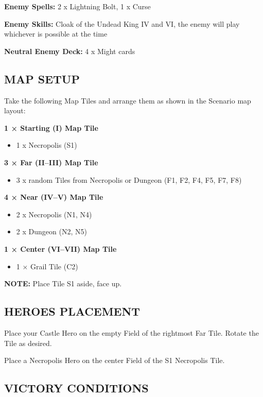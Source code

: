 \begin{multicols*}{2}
\textbf{Enemy Spells:} 2 x Lightning Bolt, 1 x Curse

\textbf{Enemy Skills:} Cloak of the Undead King IV and VI, the enemy will play whichever is possible at the time

\textbf{Neutral Enemy Deck:} 4 x Might cards

\subsection*{\MakeUppercase{Map setup}}

Take the following Map Tiles and arrange them as shown in the Scenario map layout:

\textbf{1 × Starting (I) Map Tile}
\begin{itemize}
    \item 1 x Necropolis (S1)
\end{itemize}

\textbf{3 × Far (II--III) Map Tile}
\begin{itemize}
    \item 3 x random Tiles from Necropolis or Dungeon (F1, F2, F4, F5, F7, F8)
\end{itemize}

\textbf{4 × Near (IV--V) Map Tile}
\begin{itemize}
    \item 2 x Necropolis (N1, N4)
    \item 2 x Dungeon (N2, N5)
\end{itemize}

\textbf{1 × Center (VI--VII) Map Tile}
\begin{itemize}
  \item 1 × Grail Tile (C2)
\end{itemize}

\textbf{\MakeUppercase{Note:}} Place Tile S1 aside, face up.

\subsection*{\MakeUppercase{Heroes placement}}

Place your Castle Hero on the empty Field of the rightmost Far Tile. Rotate the Tile as desired.

Place a Necropolis Hero on the center Field of the S1 Necropolis Tile.

\subsection*{\MakeUppercase{Victory Conditions}}


\end{multicols*}
